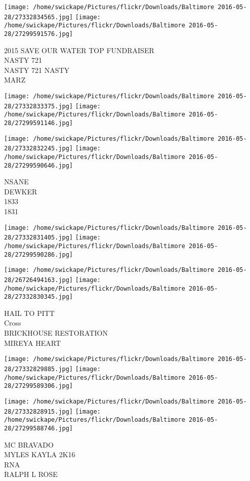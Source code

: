 \documentclass[10pt,letterpaper]{article}
\begin{document}
\texttt{[image: /home/swickape/Pictures/flickr/Downloads/Baltimore 2016-05-28/27332834565.jpg]}
\texttt{[image: /home/swickape/Pictures/flickr/Downloads/Baltimore 2016-05-28/27299591576.jpg]}

2015 SAVE OUR WATER TOP FUNDRAISER\\
NASTY 721\\
NASTY 721 NASTY\\
MARZ
\pagebreak

\texttt{[image: /home/swickape/Pictures/flickr/Downloads/Baltimore 2016-05-28/27332833375.jpg]}
\texttt{[image: /home/swickape/Pictures/flickr/Downloads/Baltimore 2016-05-28/27299591146.jpg]}

\texttt{[image: /home/swickape/Pictures/flickr/Downloads/Baltimore 2016-05-28/27332832245.jpg]}
\texttt{[image: /home/swickape/Pictures/flickr/Downloads/Baltimore 2016-05-28/27299590646.jpg]}

NSANE\\
DEWKER\\
1833\\
1831
\pagebreak

\texttt{[image: /home/swickape/Pictures/flickr/Downloads/Baltimore 2016-05-28/27332831405.jpg]}
\texttt{[image: /home/swickape/Pictures/flickr/Downloads/Baltimore 2016-05-28/27299590286.jpg]}

\texttt{[image: /home/swickape/Pictures/flickr/Downloads/Baltimore 2016-05-28/26726494163.jpg]}
\texttt{[image: /home/swickape/Pictures/flickr/Downloads/Baltimore 2016-05-28/27332830345.jpg]}

HAIL TO PITT\\
Cross\\
BRICKHOUSE RESTORATION\\
MIREYA HEART
\pagebreak

\texttt{[image: /home/swickape/Pictures/flickr/Downloads/Baltimore 2016-05-28/27332829885.jpg]}
\texttt{[image: /home/swickape/Pictures/flickr/Downloads/Baltimore 2016-05-28/27299589306.jpg]}

\texttt{[image: /home/swickape/Pictures/flickr/Downloads/Baltimore 2016-05-28/27332828915.jpg]}
\texttt{[image: /home/swickape/Pictures/flickr/Downloads/Baltimore 2016-05-28/27299588746.jpg]}

MC BRAVADO\\
MYLES KAYLA 2K16\\
RNA\\
RALPH L ROSE
\pagebreak
\end{document}
